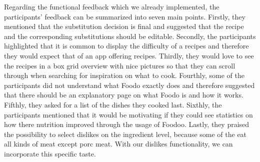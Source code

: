 Regarding the functional feedback which we already implemented, the participants' feedback can be summarized into seven main points. 
Firstly, they mentioned that the substitution decision is final and suggested that the recipe and the corresponding substitutions should be editable. 
Secondly, the participants highlighted that it is common to display the difficulty of a recipes and therefore they would expect that of an app offering recipes. 
Thirdly, they would love to see the recipes in a box grid overview with nice pictures so that they can scroll through when searching for inspiration on what to cook. 
Fourthly, some of the participants did not understand what Foodo exactly does and therefore suggested that there should be an explanatory page on what Foodo is and how it works. 
Fifthly, they asked for a list of the dishes they cooked last. 
Sixthly, the participants mentioned that it would be motivating if they could see statistics on how there nutrition improved through the usage of Foodoo.
Lastly, they praised the possibility to select dislikes on the ingredient level, because some of the eat all kinds of meat except porc meat. With our dislikes functionality, we can incorporate this specific taste.


